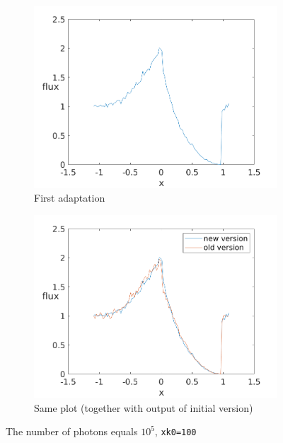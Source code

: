 \documentclass[../main/main.tex]{subfiles}
\begin{document}
\begin{figure}[!htbp]
\centering
\begin{subfigure}{.5\textwidth}
\includegraphics[width=1\textwidth]{../../introductory_exercises/P_Cygni_profile_UV_resonance/data/npot5xk0100alpha0beta1test1.png}
\caption{First adaptation}
\end{subfigure}%
\begin{subfigure}{.5\textwidth}
\includegraphics[width=1\textwidth]{../../introductory_exercises/P_Cygni_profile_UV_resonance/data/npot5xk0100alpha0beta1test10.png}
\caption{Same plot (together with output of initial version)}
\end{subfigure}
\caption{The number of photons equals $10^{5}$, \texttt{xk0=100}}
\label{PCyg_mu_eq_1}
\end{figure}
\end{document}
